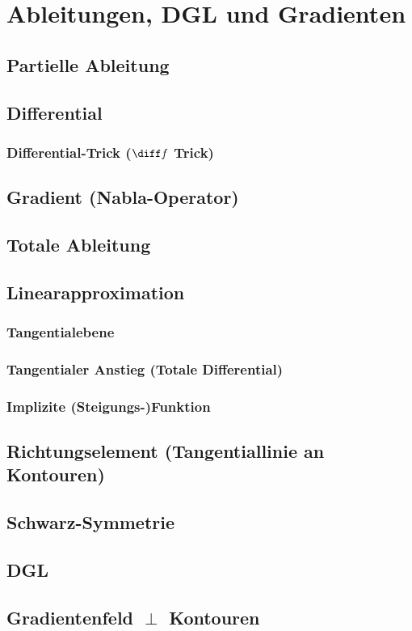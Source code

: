 \section{Ableitungen, DGL und Gradienten}

\subsection{Partielle Ableitung}


\subsection{Differential}


\subsubsection{Differential-Trick (\texorpdfstring{$\diff f$}{df} Trick)}


\subsection{Gradient (Nabla-Operator)}


\subsection{Totale Ableitung}


\subsection{Linearapproximation}

\subsubsection{Tangentialebene}

\subsubsection{Tangentialer Anstieg (Totale Differential)}

\subsubsection{Implizite (Steigungs-)Funktion}

\subsection{Richtungselement (Tangentiallinie an Kontouren)}

\subsection{Schwarz-Symmetrie}


\subsection{DGL}


\subsection{Gradientenfeld \texorpdfstring{$\perp$}{\_|\_} Kontouren}
